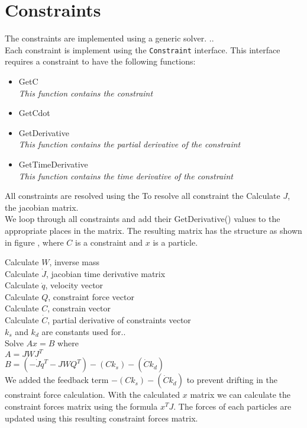 \section{Constraints}

The constraints are implemented using a generic solver.
..
\\

Each constraint is implement using the \verb"Constraint" interface.
This interface requires a constraint to have the following functions:
\begin{itemize}
  \item GetC\\
  \emph{ This function contains the constraint }
  \item GetCdot\\
  \item GetDerivative\\
  \emph{ This function contains the partial derivative of the constraint  }
  \item GetTimeDerivative\\
  \emph{ This function contains the time derivative of the constraint }
\end{itemize}

All constraints are resolved using the 
To resolve all constraint the 
\noindent Calculate $J$, the jacobian matrix.\\
We loop through all constraints and add their GetDerivative() values to the appropriate places in the matrix.
The resulting matrix has the structure as shown in figure , where $C$ is a constraint and $x$ is a particle.

Calculate $W$, inverse mass \\
Calculate $\dot{J}$, jacobian time derivative matrix\\
Calculate $\dot{q}$, velocity vector\\
Calculate $Q$, constraint force vector\\
Calculate $C$, constrain vector\\
Calculate $\dot{C}$, partial derivative of constraints vector\\
$k_s$ and $k_d$ are constants used for..\\
Solve $Ax = B$ where\\
\;\;  $A = J W J^{T}$\\
\;\;  $B = (-\dot{J} \dot{q}^{T} - J W Q^{T}) - (C k_s) - (\dot{C} k_d)$\\
We added the feedback term $- (C k_s) - (\dot{C} k_d)$ to prevent drifting in the constraint force calculation.
With the calculated $x$ matrix we can calculate the constraint forces matrix using the formula $x^{T} J$.
The forces of each particles are updated using this resulting constraint forces matrix.\\

